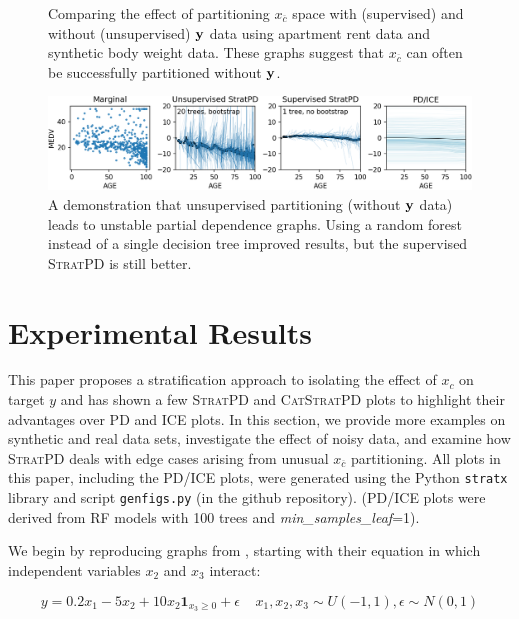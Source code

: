 \documentclass[12pt]{article}
\newcommand{\spd}{\fontfamily{cmr}\textsc{\small StratPD}}
\newcommand{\cspd}{\fontfamily{cmr}\textsc{\small CatStratPD}}
\newcommand{\xnc}{$x_{\overline{c}}$}
\begin{document}
\begin{figure}[htbp]
\begin{center}
\caption{Comparing the effect of partitioning \xnc{} space with (supervised) and without (unsupervised) $\bf y$ data using apartment rent data and synthetic body weight data. These graphs suggest that \xnc{} can often be successfully partitioned without $\bf y$.}
\label{fig:rent_weight_unsup}
\end{center}
\end{figure}

\begin{figure}[htbp]
\begin{center}
\includegraphics[scale=0.7]{images/boston_unsup.png}
\caption{A demonstration that unsupervised partitioning (without $\bf y$ data) leads to unstable partial dependence graphs. Using a random forest instead of a single decision tree improved results, but the supervised \spd{} is still better.}
\label{fig:boston_unsup}
\end{center}
\end{figure}


 
\section{Experimental Results}\label{sec:applications}

This paper proposes a stratification approach to isolating the effect of $x_c$ on target $y$ and has shown a few \spd{} and \cspd{} plots to highlight their advantages over PD and ICE plots. In this section, we provide more examples on synthetic and real data sets, investigate the effect of noisy data, and examine how \spd{} deals with edge cases arising from unusual \xnc{} partitioning.  All plots in this paper, including the PD/ICE plots, were generated using the Python {\tt stratx} library and script {\tt genfigs.py} (in the github repository). (PD/ICE plots were derived from RF models with 100 trees and {\it min\_samples\_leaf}=1). 

We begin by reproducing graphs from \cite{ICE}, starting with their equation in which independent variables $x_2$ and $x_3$ interact:

\begin{equation}\label{eq:bigX}
y = 0.2x_1 - 5x_2 + 10x_2\mathbf{1}_{x_3 \geq 0} + \epsilon~~~~~x_1, x_2, x_3 \sim U(-1,1), \epsilon \sim N(0,1)
\end{equation}
\end{document}
